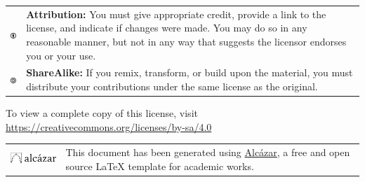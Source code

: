     \noindent
    \begin{tabular}{m{1.5cm} m{13.5cm}}
        \includegraphics[width=2em]{opening/resources/license/by.pdf} & \textbf{Attribution:} You must give appropriate credit, provide a link to the license, and indicate if changes were made. You may do so in any reasonable manner, but not in any way that suggests the licensor endorses you or your use.\\
        \includegraphics[width=2em]{opening/resources/license/sa.pdf} & \textbf{ShareAlike:} If you remix, transform, or build upon the material, you must distribute your contributions under the same license as the original.
    \end{tabular}
    
    \noindent To view a complete copy of this license, visit 
    \href{https://creativecommons.org/licenses/by-nc-sa/4.0/}{https://creativecommons.org/licenses/by-sa/4.0}

\endgroup



\begingroup

    \vspace*{2mm}

    \setlength\tabcolsep{0pt}
    \renewcommand*{\arraystretch}{1.4}
    \renewcommand{\baselinestretch}{0.9}\footnotesize  %
    
    \noindent
    \begin{tabular}{m{3.5cm} m{11.5cm}}
        \includegraphics[width=3cm]{opening/resources/logos/alcazar.pdf} & \noindent This document has been generated using {\href{https://github.com/dpmj/alcazar}{Alcázar}}, a free and open source {\LaTeX} template for academic works. \\
    \end{tabular}

    

\endgroup
